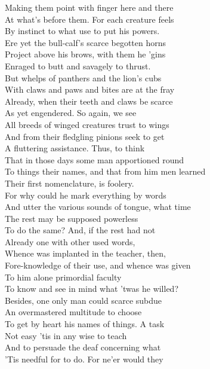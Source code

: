 Making them point with finger here and there\\
At what's before them. For each creature feels\\
By instinct to what use to put his powers.\\
Ere yet the bull-calf's scarce begotten horns\\
Project above his brows, with them he 'gins\\
Enraged to butt and savagely to thrust.\\
But whelps of panthers and the lion's cubs\\
With claws and paws and bites are at the fray\\
Already, when their teeth and claws be scarce\\
As yet engendered. So again, we see\\
All breeds of winged creatures trust to wings\\
And from their fledgling pinions seek to get\\
A fluttering assistance. Thus, to think\\
That in those days some man apportioned round\\
To things their names, and that from him men learned\\
Their first nomenclature, is foolery.\\
For why could he mark everything by words\\
And utter the various sounds of tongue, what time\\
The rest may be supposed powerless\\
To do the same? And, if the rest had not\\
Already one with other used words,\\
Whence was implanted in the teacher, then,\\
Fore-knowledge of their use, and whence was given\\
To him alone primordial faculty\\
To know and see in mind what 'twas he willed?\\
Besides, one only man could scarce subdue\\
An overmastered multitude to choose\\
To get by heart his names of things. A task\\
Not easy 'tis in any wise to teach\\
And to persuade the deaf concerning what\\
'Tis needful for to do. For ne'er would they\\
